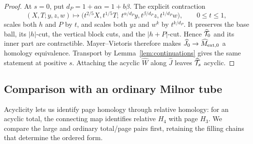 \begin{proof}
At \(s=0\), put \(d_P=1+a\alpha=1+b\beta\).
The explicit contraction
\begin{equation}
(X,T;y,z,w)\longmapsto
\bigl(t^{2/5}X,t^{1/5}T;\
t^{\alpha/d_P}y,t^{\beta/d_P}z,t^{1/d_P}w\bigr),
\qquad 0\le t\le1,
\label{eq:tube-12a}
\end{equation}
scales both \(h\) and \(P\) by \(t\), and scales
both \(yz\) and \(w^k\) by \(t^{k/d_P}\).
It preserves the base ball, its \(|h|\)-cut,
the vertical block cuts, and the \(|h+P|\)-cut.
Hence \(\widehat{\mathcal T}_0\) and its inner part are
contractible. Mayer--Vietoris therefore makes
\(\widehat J_0\to\widehat M_{{\rm ext},0}\) a homology
equivalence. Transport by Lemma~\ref{lem:continuations} gives
the same statement at positive \(s\). Attaching the acyclic
\(\widehat W\) along \(\widehat J\) leaves
\(\widehat{\mathcal T}_s\) acyclic.
\end{proof}

\subsection{Comparison with an ordinary Milnor tube}

Acyclicity lets us identify page homology through relative homology:
for an acyclic total, the connecting map identifies relative \(H_4\)
with page \(H_3\). We compare the large and ordinary total/page pairs
first, retaining the filling chains that determine the ordered form.

